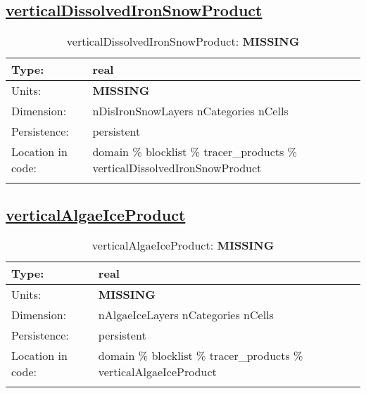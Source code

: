 \subsection[verticalDissolvedIronSnowProduct]{\hyperref[sec:var_tab_tracer_products]{verticalDissolvedIronSnowProduct}}
\label{subsec:var_sec_tracer_products_verticalDissolvedIronSnowProduct}
\begin{center}
\begin{longtable}{| p{2.0in} | p{4.0in} |}
        \hline 
        Type: & real \\
        \hline 
        Units: & {\bf \color{red} MISSING} \\
        \hline 
        Dimension: & nDisIronSnowLayers nCategories nCells \\
        \hline 
        Persistence: & persistent \\
        \hline 
         Location in code: & domain \% blocklist \% tracer\_products \% verticalDissolvedIronSnowProduct \\
         \hline 
    \caption{verticalDissolvedIronSnowProduct: {\bf \color{red} MISSING}}
\end{longtable}
\end{center}
\subsection[verticalAlgaeIceProduct]{\hyperref[sec:var_tab_tracer_products]{verticalAlgaeIceProduct}}
\label{subsec:var_sec_tracer_products_verticalAlgaeIceProduct}
\begin{center}
\begin{longtable}{| p{2.0in} | p{4.0in} |}
        \hline 
        Type: & real \\
        \hline 
        Units: & {\bf \color{red} MISSING} \\
        \hline 
        Dimension: & nAlgaeIceLayers nCategories nCells \\
        \hline 
        Persistence: & persistent \\
        \hline 
         Location in code: & domain \% blocklist \% tracer\_products \% verticalAlgaeIceProduct \\
         \hline 
    \caption{verticalAlgaeIceProduct: {\bf \color{red} MISSING}}
\end{longtable}
\end{center}
